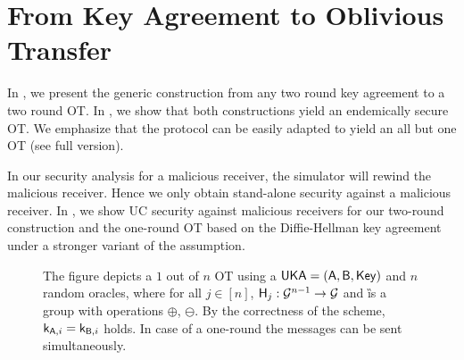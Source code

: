 \section{From Key Agreement to Oblivious Transfer}\label{sec:endemicOT}

In , we present the generic construction from any two round key agreement to a two round OT. In , we show that both constructions yield an endemically secure OT. We emphasize that the protocol can be easily adapted to yield an all but one OT (see \iffullversion{}\else full version\fi).

In our security analysis for a malicious receiver, the simulator will rewind the malicious receiver. Hence we only obtain stand-alone security against a malicious receiver. In , we show UC security against malicious receivers for our two-round construction and the one-round OT based on the Diffie-Hellman key agreement under a stronger variant of the \DDH assumption.


\begin{figure}
\centering
\scalebox{0.9}
{
}
\myvspace{-0.3cm}
\caption{The figure depicts a $1$ out of $n$ OT using a $\mathsf{UKA}=(\mathsf{A},\mathsf{B},\mathsf{Key})$ and $n$ random oracles, where for all $j\in[n]$, $\mathsf{H}_j:\mathcal{G}^{n-1}\rightarrow\mathcal{G}$ and \G is a group with operations $\oplus$, $\ominus$. By the correctness of the \UKA scheme, $\mathsf{k}_{\mathsf{A},i}=\mathsf{k}_{\mathsf{B},i}$ holds. In case of a one-round \UKA the messages can be sent simultaneously.}
\label{fig:KAtoOT}
\end{figure}



